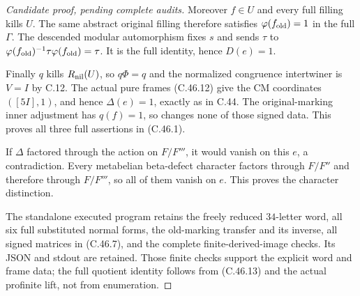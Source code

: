 \begin{proof}[Candidate proof, pending complete audits]
Moreover $f\in U$ and every full filling kills $U$.
The same abstract original filling therefore satisfies
$\varphi(f_{\rm old})=1$ in the full $\Gamma$. The descended
modular automorphism fixes $s$ and sends $\tau$ to
$\varphi(f_{\rm old})^{-1}\tau\varphi(f_{\rm old})=\tau$.
It is the full identity, hence $D(e)=1$.

Finally $q$ kills $R_{\rm nil}(U)$, so $q\Phi=q$ and the
normalized congruence intertwiner is $V=I$ by C.12. The actual
pure frames (C.46.12) give the CM coordinates $([5I],1)$,
and hence $\Delta(e)=1$, exactly as in C.44. The original-marking
inner adjustment has $q(f)=1$, so changes none of those signed data.
This proves all three full assertions in (C.46.1).

If $\Delta$ factored through the action on $F/F'''$, it would
vanish on this $e$, a contradiction. Every metabelian beta-defect
character factors through $F/F''$ and therefore through $F/F'''$,
so all of them vanish on $e$. This proves the character distinction.

The standalone executed program
retains the freely reduced $34$-letter word, all six full substituted
normal forms, the old-marking transfer and its inverse, all signed
matrices in (C.46.7), and the complete finite-derived-image checks.
Its JSON and stdout are retained. Those finite checks support the
explicit word and frame data; the full quotient identity follows
from (C.46.13) and the actual profinite lift, not from enumeration.
\end{proof}

